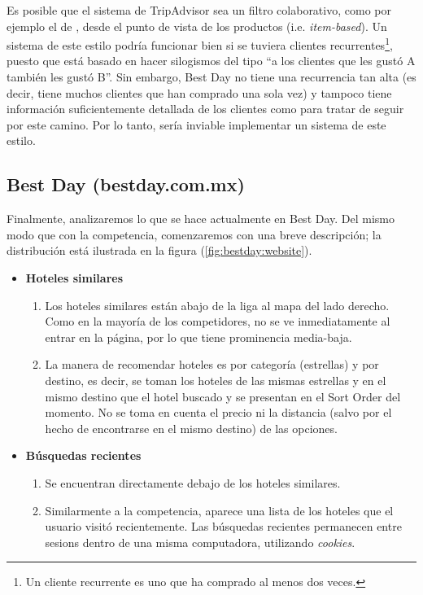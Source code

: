 \documentclass[12pt]{report}
\begin{document}
Es posible que el sistema de TripAdvisor sea un filtro colaborativo, como por ejemplo el de \cite{mmds}, desde el punto de vista de los productos (i.e. \emph{item-based}). Un sistema de este estilo podría funcionar bien si se tuviera clientes recurrentes\footnote{Un cliente recurrente es uno que ha comprado al menos dos veces.}, puesto que está basado en hacer silogismos del tipo ``a los clientes que les gustó A también les gustó B''. Sin embargo, Best Day no tiene una recurrencia tan alta (es decir, tiene muchos clientes que han comprado una sola vez) y tampoco tiene información suficientemente detallada de los clientes como para tratar de seguir por este camino. Por lo tanto, sería inviable implementar un sistema de este estilo.


\subsection*{Best Day (bestday.com.mx)}

Finalmente, analizaremos lo que se hace actualmente en Best Day. Del mismo modo que con la competencia, comenzaremos con una breve descripción; la distribución está ilustrada en la figura (\ref{fig:bestday:website}).
\begin{itemize}
	\item \textbf{Hoteles similares}
	\begin{enumerate}
		\item Los hoteles similares están abajo de la liga al mapa del lado derecho. Como en la mayoría de los competidores, no se ve inmediatamente al entrar en la página, por lo que tiene prominencia media-baja.
		\item La manera de recomendar hoteles es por categoría (estrellas) y por destino, es decir, se toman los hoteles de las mismas estrellas y en el mismo destino que el hotel buscado y se presentan en el Sort Order del momento. No se toma en cuenta el precio ni la distancia (salvo por el hecho de encontrarse en el mismo destino) de las opciones.
	\end{enumerate}
	\item \textbf{Búsquedas recientes}
	\begin{enumerate}
		\item Se encuentran directamente debajo de los hoteles similares.
		\item Similarmente a la competencia, aparece una lista de los hoteles que el usuario visitó recientemente. Las búsquedas recientes permanecen entre \glspl{sesion} dentro de una misma computadora, utilizando \emph{cookies}.
	\end{enumerate}
\end{itemize}
\end{document}

